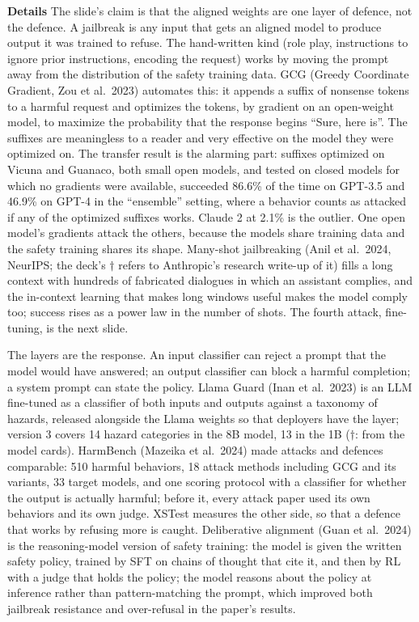 \documentclass[11pt,letterpaper]{article}
\newcommand{\para}[1]{\medskip\noindent\textbf{#1}\quad}
\begin{document}
\para{Details} The slide's claim is that the aligned weights are one layer of defence, not the defence. A jailbreak is any input that gets an aligned model to produce output it was trained to refuse. The hand-written kind (role play, instructions to ignore prior instructions, encoding the request) works by moving the prompt away from the distribution of the safety training data. GCG (Greedy Coordinate Gradient, Zou et al.\ 2023) automates this: it appends a suffix of nonsense tokens to a harmful request and optimizes the tokens, by gradient on an open-weight model, to maximize the probability that the response begins ``Sure, here is''. The suffixes are meaningless to a reader and very effective on the model they were optimized on. The transfer result is the alarming part: suffixes optimized on Vicuna and Guanaco, both small open models, and tested on closed models for which no gradients were available, succeeded 86.6\% of the time on GPT-3.5 and 46.9\% on GPT-4 in the ``ensemble'' setting, where a behavior counts as attacked if any of the optimized suffixes works. Claude 2 at 2.1\% is the outlier. One open model's gradients attack the others, because the models share training data and the safety training shares its shape. Many-shot jailbreaking (Anil et al.\ 2024, NeurIPS; the deck's $\dagger$ refers to Anthropic's research write-up of it) fills a long context with hundreds of fabricated dialogues in which an assistant complies, and the in-context learning that makes long windows useful makes the model comply too; success rises as a power law in the number of shots. The fourth attack, fine-tuning, is the next slide.

The layers are the response. An input classifier can reject a prompt that the model would have answered; an output classifier can block a harmful completion; a system prompt can state the policy. Llama Guard (Inan et al.\ 2023) is an LLM fine-tuned as a classifier of both inputs and outputs against a taxonomy of hazards, released alongside the Llama weights so that deployers have the layer; version 3 covers 14 hazard categories in the 8B model, 13 in the 1B ($\dagger$: from the model cards). HarmBench (Mazeika et al.\ 2024) made attacks and defences comparable: 510 harmful behaviors, 18 attack methods including GCG and its variants, 33 target models, and one scoring protocol with a classifier for whether the output is actually harmful; before it, every attack paper used its own behaviors and its own judge. XSTest measures the other side, so that a defence that works by refusing more is caught. Deliberative alignment (Guan et al.\ 2024) is the reasoning-model version of safety training: the model is given the written safety policy, trained by SFT on chains of thought that cite it, and then by RL with a judge that holds the policy; the model reasons about the policy at inference rather than pattern-matching the prompt, which improved both jailbreak resistance and over-refusal in the paper's results.
\end{document}
